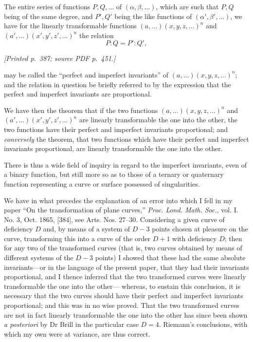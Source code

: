 \documentclass[11pt,a4paper]{article}
\newcommand{\sourcepage}[2]{\par\smallskip\noindent\textit{[Printed p.~#1; source PDF p.~#2.]}\par\smallskip}
\begin{document}
The entire series of functions $P,Q,\ldots$ of $(\alpha,\beta,\ldots)$, which are
such that $P,Q$ being of the same degree, and $P',Q'$ being the like functions of
$(\alpha',\beta',\ldots)$, we have for the linearly transformable functions
$(a,\ldots)(x,y,z,\ldots)^n$ and $(a',\ldots)(x',y',z',\ldots)^n$ the relation
\[
P:Q=P':Q',
\]

\sourcepage{387}{451}
\noindent
may be called the ``perfect and imperfect invariants'' of
$(a,\ldots)(x,y,z,\ldots)^n$; and the relation in question be briefly referred to by the
expression that the perfect and imperfect invariants are proportional.

We have then the theorem that if the two functions $(a,\ldots)(x,y,z,\ldots)^n$ and
$(a',\ldots)(x',y',z',\ldots)^n$ are linearly transformable the one into the other,
the two functions have their perfect and imperfect invariants proportional; and
\textit{conversely} the theorem, that two functions which have their perfect and
imperfect invariants proportional, are linearly transformable the one into the other.

There is thus a wide field of inquiry in regard to the imperfect invariants, even of
a binary function, but still more so as to those of a ternary or quaternary function
representing a curve or surface possessed of singularities.

We have in what precedes the explanation of an error into which I fell in my paper
``On the transformation of plane curves,'' \textit{Proc. Lond. Math. Soc.}, vol. I. No. 3,
Oct. 1865, [384], see Arts. Nos. 27--30. Considering a given curve of deficiency $D$
and, by means of a system of $D-3$ points chosen at pleasure on the curve, transforming
this into a curve of the order $D+1$ with deficiency $D$; then for any two of the
transformed curves (that is, two curves obtained by means of different systems of the
$D-3$ points) I showed that these had the same absolute invariants---or in the language
of the present paper, that they had their invariants proportional, and I thence inferred
that the two transformed curves were linearly transformable the one into the other---
whereas, to sustain this conclusion, it is necessary that the two curves should have
their perfect and imperfect invariants proportional; and this was in no wise proved.
That the two transformed curves are not in fact linearly transformable the one into the
other has since been shown \textit{a posteriori} by Dr Brill in the particular case $D=4$.
Riemann's conclusions, with which my own were at variance, are thus correct.
\end{document}
